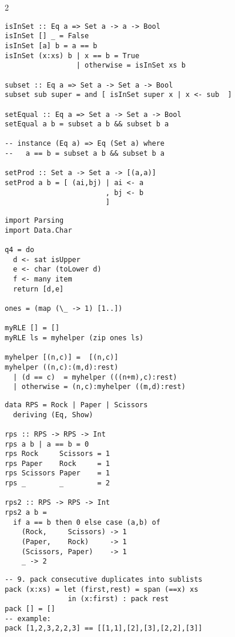 \documentclass{article}
\def \columncount {2}
\begin{document}
\begin{multicols*}{\columncount}
\begin{outline}[longenum]
\begin{verbatim}
isInSet :: Eq a => Set a -> a -> Bool
isInSet [] _ = False
isInSet [a] b = a == b
isInSet (x:xs) b | x == b = True
                 | otherwise = isInSet xs b

subset :: Eq a => Set a -> Set a -> Bool
subset sub super = and [ isInSet super x | x <- sub  ]

setEqual :: Eq a => Set a -> Set a -> Bool
setEqual a b = subset a b && subset b a

-- instance (Eq a) => Eq (Set a) where
--   a == b = subset a b && subset b a

setProd :: Set a -> Set a -> [(a,a)]
setProd a b = [ (ai,bj) | ai <- a
                        , bj <- b
                        ]

\end{verbatim}


\begin{verbatim}
import Parsing
import Data.Char

q4 = do 
  d <- sat isUpper
  e <- char (toLower d)
  f <- many item
  return [d,e]

ones = (map (\_ -> 1) [1..])

myRLE [] = []
myRLE ls = myhelper (zip ones ls)

myhelper [(n,c)] =  [(n,c)] 
myhelper ((n,c):(m,d):rest)
  | (d == c)  = myhelper (((n+m),c):rest)
  | otherwise = (n,c):myhelper ((m,d):rest)
\end{verbatim}

\begin{verbatim}
data RPS = Rock | Paper | Scissors
  deriving (Eq, Show)

rps :: RPS -> RPS -> Int
rps a b | a == b = 0
rps Rock     Scissors = 1
rps Paper    Rock     = 1
rps Scissors Paper    = 1
rps _        _        = 2

rps2 :: RPS -> RPS -> Int
rps2 a b =
  if a == b then 0 else case (a,b) of
    (Rock,     Scissors) -> 1
    (Paper,    Rock)     -> 1
    (Scissors, Paper)    -> 1
    _ -> 2

\end{verbatim}

\begin{verbatim}
-- 9. pack consecutive duplicates into sublists
pack (x:xs) = let (first,rest) = span (==x) xs
               in (x:first) : pack rest
pack [] = []
-- example:
pack [1,2,3,2,2,3] == [[1,1],[2],[3],[2,2],[3]]
\end{verbatim}




\end{outline}
\end{multicols*}
\end{document}

